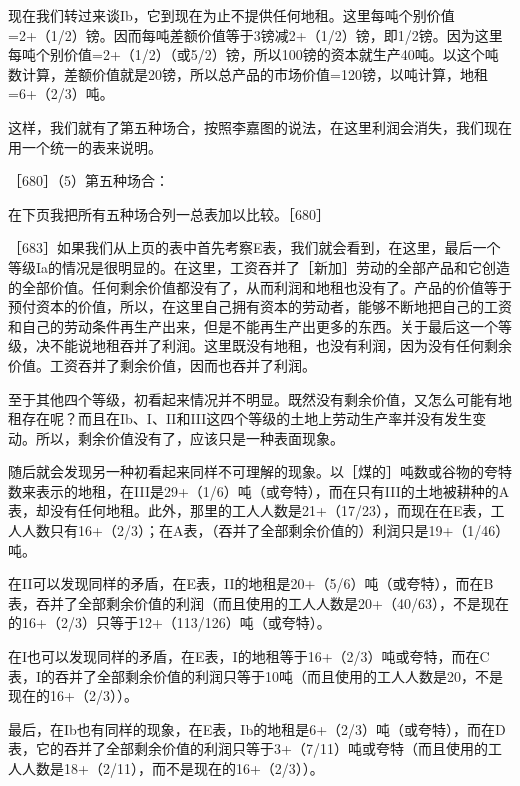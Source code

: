 现在我们转过来谈Ib，它到现在为止不提供任何地租。这里每吨个别价值=2+（1/2）镑。因而每吨差额价值等于3镑减2+（1/2）镑，即1/2镑。因为这里每吨个别价值=2+（1/2）（或5/2）镑，所以100镑的资本就生产40吨。以这个吨数计算，差额价值就是20镑，所以总产品的市场价值=120镑，以吨计算，地租=6+（2/3）吨。

这样，我们就有了第五种场合，按照李嘉图的说法，在这里利润会消失，我们现在用一个统一的表来说明。

［680］（5）第五种场合：

\todo{}

在下页我把所有五种场合列一总表加以比较。［680］

\todo{}


［683］如果我们从上页的表中首先考察E表，我们就会看到，在这里，最后一个等级Ia的情况是很明显的。在这里，工资吞并了［新加］劳动的全部产品和它创造的全部价值。任何剩余价值都没有了，从而利润和地租也没有了。产品的价值等于预付资本的价值，所以，在这里自己拥有资本的劳动者，能够不断地把自己的工资和自己的劳动条件再生产出来，但是不能再生产出更多的东西。关于最后这一个等级，决不能说地租吞并了利润。这里既没有地租，也没有利润，因为没有任何剩余价值。工资吞并了剩余价值，因而也吞并了利润。

至于其他四个等级，初看起来情况并不明显。既然没有剩余价值，又怎么可能有地租存在呢？而且在Ib、I、II和III这四个等级的土地上劳动生产率并没有发生变动。所以，剩余价值没有了，应该只是一种表面现象。

随后就会发现另一种初看起来同样不可理解的现象。以［煤的］吨数或谷物的夸特数来表示的地租，在III是29+（1/6）吨（或夸特），而在只有III的土地被耕种的A表，却没有任何地租。此外，那里的工人人数是21+（17/23），而现在在E表，工人人数只有16+（2/3）；在A表，（吞并了全部剩余价值的）利润只是19+（1/46）吨。

在II可以发现同样的矛盾，在E表，II的地租是20+（5/6）吨（或夸特），而在B表，吞并了全部剩余价值的利润（而且使用的工人人数是20+（40/63），不是现在的16+（2/3）只等于12+（113/126）吨（或夸特）。

在I也可以发现同样的矛盾，在E表，I的地租等于16+（2/3）吨或夸特，而在C表，I的吞并了全部剩余价值的利润只等于10吨（而且使用的工人人数是20，不是现在的16+（2/3））。

最后，在Ib也有同样的现象，在E表，Ib的地租是6+（2/3）吨（或夸特），而在D表，它的吞并了全部剩余价值的利润只等于3+（7/11）吨或夸特（而且使用的工人人数是18+（2/11），而不是现在的16+（2/3））。

